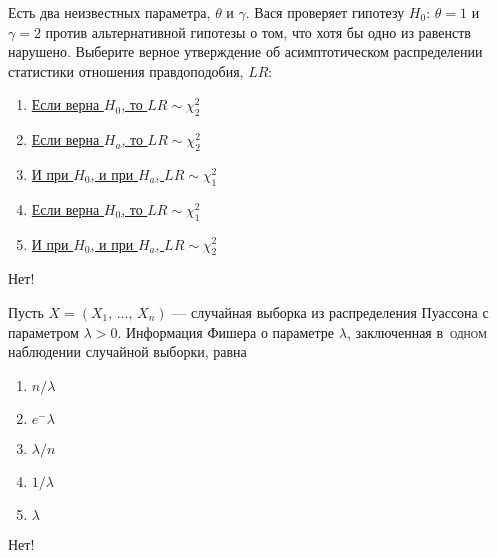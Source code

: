 \documentclass[t]{beamer}
\begin{document}
 \begin{frame} \label{20-No} 
\begin{block}{20} 

    Есть два неизвестных параметра, $\theta$ и $\gamma$. Вася проверяет гипотезу $H_0$: $\theta = 1$ и $\gamma = 2$ против альтернативной гипотезы о том, что хотя бы одно из равенств нарушено. Выберите верное утверждение об асимптотическом распределении статистики отношения правдоподобия, $LR$:


 \end{block} 
\begin{enumerate} 
\item[] \hyperlink{20-Yes}{\beamergotobutton{} Если верна $H_0$, то $LR \sim \chi_2^2$}
\item[] \hyperlink{20-No}{\beamergotobutton{} Если верна $H_a$, то $LR \sim \chi_2^2$}
\item[] \hyperlink{20-No}{\beamergotobutton{} И при $H_0$, и при $H_a$, $LR \sim \chi_1^2$}
\item[] \hyperlink{20-No}{\beamergotobutton{} Если верна $H_0$, то $LR \sim \chi_1^2$}
\item[] \hyperlink{20-No}{\beamergotobutton{} И при $H_0$, и при $H_a$, $LR \sim \chi_2^2$}
\end{enumerate} 

 \alert{Нет!} 
\end{frame} 


 \begin{frame} \label{21-No} 
\begin{block}{21} 

  Пусть $X = (X_1, \, \ldots, \, X_n)$ — случайная выборка из распределения Пуассона с параметром $\lambda > 0$. Информация Фишера о параметре $\lambda$, заключенная в~\textsc{одном} наблюдении случайной выборки, равна


 \end{block} 
\begin{enumerate} 
\item[] \hyperlink{21-No}{\beamergotobutton{}  $n / \lambda$}
\item[] \hyperlink{21-No}{\beamergotobutton{} $e^-\lambda$}
\item[] \hyperlink{21-No}{\beamergotobutton{} $\lambda / n$}
\item[] \hyperlink{21-Yes}{\beamergotobutton{} $1 / \lambda$}
\item[] \hyperlink{21-No}{\beamergotobutton{} $\lambda$}
\end{enumerate} 

 \alert{Нет!} 
\end{frame} 
\end{document}
